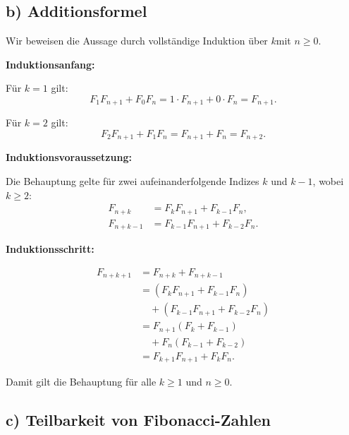 \documentclass{report}
\begin{document}
\subsection*{b) Additionsformel}

\begin{myproof}
  Wir beweisen die Aussage durch vollständige
  Induktion über $k$mit $n\ge0$.

  \textbf{Induktionsanfang:}

  Für $k=1$ gilt:
  \[
    F_1F_{n+1}+F_0F_n
    =1\cdot F_{n+1}+0\cdot F_n
    =F_{n+1}.
  \]

  Für $k=2$ gilt:
  \[
    F_2F_{n+1}+F_1F_n
    =F_{n+1}+F_n
    =F_{n+2}.
  \]

  \textbf{Induktionsvoraussetzung:}

  Die Behauptung gelte für zwei aufeinanderfolgende
  Indizes $k$ und $k-1$, wobei $k\ge2$:
  \begin{align*}
    F_{n+k}
    &=F_kF_{n+1}+F_{k-1}F_n,\\
    F_{n+k-1}
    &=F_{k-1}F_{n+1}+F_{k-2}F_n.
  \end{align*}

  \textbf{Induktionsschritt:}

  \begin{align*}
    F_{n+k+1}
    &=F_{n+k}+F_{n+k-1}\\
    &=(F_kF_{n+1}+F_{k-1}F_n)\\
    &\quad +(F_{k-1}F_{n+1}+F_{k-2}F_n)\\
    &=F_{n+1}(F_k+F_{k-1})\\
    &\quad +F_n(F_{k-1}+F_{k-2})\\
    &=F_{k+1}F_{n+1}+F_kF_n.
  \end{align*}

  Damit gilt die Behauptung für alle
  $k\ge1$ und $n\ge0$.
\end{myproof}


\subsection*{c) Teilbarkeit von Fibonacci-Zahlen}
\end{document}

